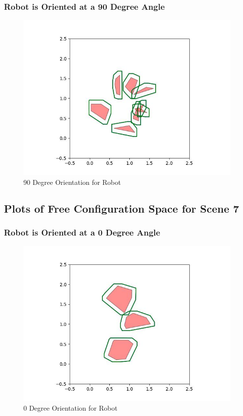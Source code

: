 \documentclass{article}
\begin{document}
\newpage
\subsubsection{Robot is Oriented at a 90 Degree Angle}
\begin{figure}[h!]
	\includegraphics[width= 0.9 \linewidth]{Problem3_minkowski6_90.jpg}
	\centering
	\caption{90 Degree Orientation for Robot}
	\label{Problem3_minkowski6_90.jpg}
\end{figure}

\newpage
\subsection{Plots of Free Configuration Space for Scene 7}
\subsubsection{Robot is Oriented at a 0 Degree Angle}
\begin{figure}[h!]
	\includegraphics[width= 0.9 \linewidth]{Problem3_minkowski7_0.jpg}
	\centering
	\caption{0 Degree Orientation for Robot}
	\label{Problem3_minkowski7_0.jpg}
\end{figure}
\end{document}
